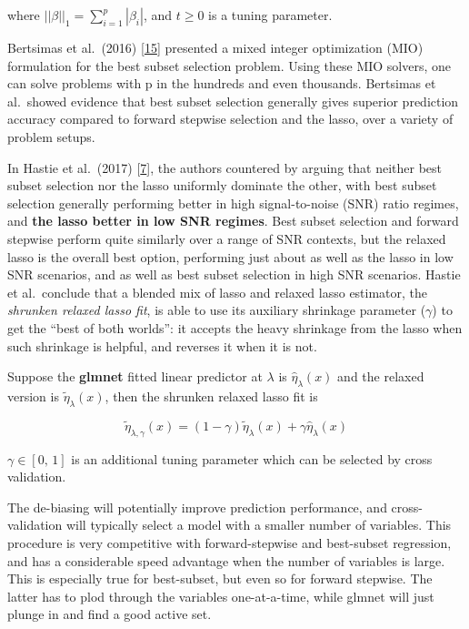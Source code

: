 \documentclass[
]{book}
\begin{document}
where \(||\beta||_1 = \sum_{i=1}^{p} |\beta_i|\), and \(t \geq 0\) is a tuning parameter.

Bertsimas et al.~(2016) {[}\protect\hyperlink{ref-Bertsimas:2016aa}{15}{]} presented a mixed integer optimization (MIO)
formulation for the best subset selection problem. Using these MIO solvers,
one can solve problems with p in the hundreds and even thousands.
Bertsimas et al.~showed evidence that
best subset selection generally gives superior prediction accuracy compared
to forward stepwise selection and the lasso, over a variety of problem setups.

In Hastie et al.~(2017) {[}\protect\hyperlink{ref-Hastie:2017aa}{7}{]}, the authors countered by arguing that
neither best subset selection nor the lasso uniformly dominate the other,
with best subset selection generally performing better in high signal-to-noise (SNR)
ratio regimes, and \textbf{the lasso better in low SNR regimes}.
Best subset selection and forward stepwise perform quite similarly over
a range of SNR contexts, but the relaxed lasso is the overall best option,
performing just about as well as the lasso in low SNR scenarios,
and as well as best subset selection in high SNR scenarios.
Hastie et al.~conclude that a blended mix of lasso and relaxed lasso estimator,
the \emph{shrunken relaxed lasso fit}, is able to use its auxiliary shrinkage
parameter (\(\gamma\)) to get the ``best of both worlds'':
it accepts the heavy shrinkage from the lasso when such shrinkage is helpful, and reverses it when it is not.

Suppose the \textbf{glmnet} fitted linear predictor at \(\lambda\) is \(\hat{\eta}_\lambda(x)\)
and the relaxed version is \(\tilde{\eta}_\lambda(x)\), then the shrunken relaxed lasso fit is

\begin{equation}

\tilde{\eta}_{\lambda,\gamma}(x)=(1-\gamma)\tilde{\eta}_\lambda(x) + \gamma \hat{\eta}_\lambda(x)

 \label{eq:blended}
\end{equation}

\(\gamma \in [0,\, 1]\) is an additional tuning parameter which can be selected by cross validation.

The de-biasing will potentially improve prediction performance, and
cross-validation will typically select a model with a smaller number of variables.
This procedure is very competitive with forward-stepwise and
best-subset regression, and has a considerable speed advantage when the
number of variables is large. This is especially true for best-subset,
but even so for forward stepwise. The latter has to plod through the
variables one-at-a-time, while glmnet will just plunge in and find a good active set.
\end{document}
